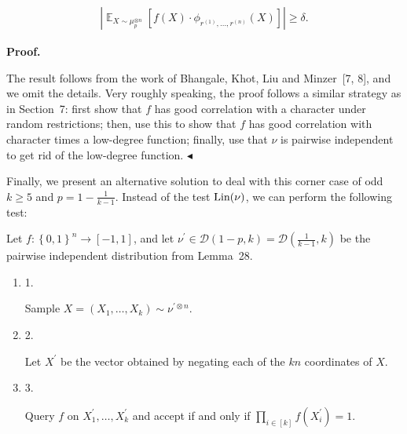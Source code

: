 \[\begin{gathered}
\left|\mathop{\mathbb{E}}_{X\sim\mu_{p}^{\otimes n}}\left[f(X)\cdot\phi_{r^{\left(1\right)},\dots,r^{\left(n\right)}}(X)\right]\right|\geqslant\delta.
\end{gathered}\]






\par\medskip\noindent\textbf{Proof.}\par




The result follows from the work of Bhangale, Khot, Liu and Minzer [7, 8], and we omit the details.
Very roughly speaking, the proof follows a similar strategy as in Section 7: first show that $f$ has good correlation with a character under random restrictions; then, use this to show that $f$ has good correlation with character times a low-degree function; finally, use that $\nu$ is pairwise independent to get rid of the low-degree function.
$\blacktriangleleft$\par




Finally, we present an alternative solution to deal with this corner case of odd $k\geqslant 5$ and $p=1-\frac{1}{k-1}$.
Instead of the test $\textnormal{Lin}(\nu)$, we can perform the following test:\par




Let $f:\left\{0,1\right\}^{n}\to[-1,1]$, and let $\nu^{\prime}\in\mathcal{D}(1-p,k)=\mathcal{D}(\frac{1}{k-1},k)$ be the pairwise independent distribution from Lemma 28.\par


\begin{enumerate}


\item[] 
1. 


Sample $X=(X_{1},\dots,X_{k})\sim\nu^{\prime\otimes n}$.\par





\item[] 
2. 


Let $X^{\prime}$ be the vector obtained by negating each of the $kn$ coordinates of $X$.\par





\item[] 
3. 


Query $f$ on $X^{\prime}_{1},\dots,X^{\prime}_{k}$ and accept if and only if $\prod_{i\in[k]}f(X^{\prime}_{i})=1$.\par





\end{enumerate}


